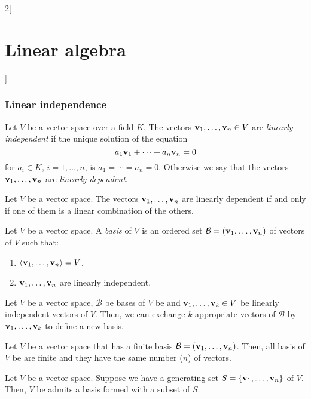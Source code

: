 \documentclass[../../../main.tex]{subfiles}
\begin{document}
\begin{multicols}{2}[\section{Linear algebra}]
  \subsubsection{Linear independence}
  \begin{definition}
    Let $V$ be a vector space over a field $K$. The vectors $\boldsymbol{\mathrm{v}}_1,\ldots,\boldsymbol{\mathrm{v}}_n\in V$ are \emph{linearly independent} if the unique solution of the equation $$a_1\boldsymbol{\mathrm{v}}_1+\cdots+a_n\boldsymbol{\mathrm{v}}_n=0$$ for $a_i\in K$, $i=1,\ldots,n$, is $a_1=\cdots=a_n=0$. Otherwise we say that the vectors $\boldsymbol{\mathrm{v}}_1,\ldots,\boldsymbol{\mathrm{v}}_n$ are \emph{linearly dependent}.
  \end{definition}
  \begin{lemma}
    Let $V$ be a vector space. The vectors $\boldsymbol{\mathrm{v}}_1,\ldots,\boldsymbol{\mathrm{v}}_n$ are linearly dependent if and only if one of them is a linear combination of the others.
  \end{lemma}
  \begin{definition}
    Let $V$ be a vector space. A \emph{basis} of $V$ is an ordered set $\mathcal{B}=(\boldsymbol{\mathrm{v}}_1,\ldots,\boldsymbol{\mathrm{v}}_n)$ of vectors of $V$ such that:
    \begin{enumerate}
      \item $\langle \boldsymbol{\mathrm{v}}_1,\ldots,\boldsymbol{\mathrm{v}}_n\rangle = V$.
      \item $\boldsymbol{\mathrm{v}}_1,\ldots,\boldsymbol{\mathrm{v}}_n$ are linearly independent.
    \end{enumerate}
  \end{definition}
  \begin{lemma}
    Let $V$ be a vector space, $\mathcal{B}$ be bases of $V$ be and $\boldsymbol{\mathrm{v}}_1,\ldots,\boldsymbol{\mathrm{v}}_k\in V$ be linearly independent vectors of $V$. Then, we can exchange $k$ appropriate vectors of $\mathcal{B}$ by $\boldsymbol{\mathrm{v}}_1,\ldots,\boldsymbol{\mathrm{v}}_k$ to define a new basis.
  \end{lemma}
  \begin{corollary}
    Let $V$ be a vector space that has a finite basis $\mathcal{B}=(\boldsymbol{\mathrm{v}}_1,\ldots,\boldsymbol{\mathrm{v}}_n)$. Then, all basis of $V$ be are finite and they have the same number ($n$) of vectors.
  \end{corollary}
  \begin{lemma}
    Let $V$ be a vector space. Suppose we have a generating set $S=\{\boldsymbol{\mathrm{v}}_1,\ldots,\boldsymbol{\mathrm{v}}_n\}$ of $V$. Then, $V$ be admits a basis formed with a subset of $S$.

\end{lemma}
\end{multicols}
\end{document}
